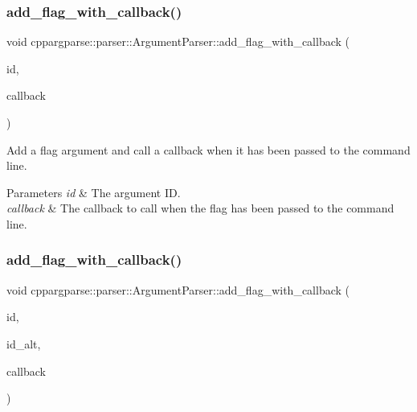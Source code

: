 \subsubsection{\texorpdfstring{add\+\_\+flag\+\_\+with\+\_\+callback()}{add\_flag\_with\_callback()}\hspace{0.1cm}{\footnotesize\ttfamily [1/3]}}
{\footnotesize\ttfamily void cppargparse\+::parser\+::\+Argument\+Parser\+::add\+\_\+flag\+\_\+with\+\_\+callback (\begin{DoxyParamCaption}\item[{const std\+::string \&}]{id,  }\item[{const std\+::function$<$ void(const \hyperlink{classcppargparse_1_1parser_1_1ArgumentParser}{Argument\+Parser} \&)$>$ \&}]{callback }\end{DoxyParamCaption})\hspace{0.3cm}{\ttfamily [inline]}}



Add a flag argument and call a callback when it has been passed to the command line. 


\begin{DoxyParams}{Parameters}
{\em id} & The argument ID. \\
\hline
{\em callback} & The callback to call when the flag has been passed to the command line. \\
\hline
\end{DoxyParams}
\mbox{\label{classcppargparse_1_1parser_1_1ArgumentParser_ac117877909d58e4a18d6a5094c2c6877}} 
\subsubsection{\texorpdfstring{add\+\_\+flag\+\_\+with\+\_\+callback()}{add\_flag\_with\_callback()}\hspace{0.1cm}{\footnotesize\ttfamily [2/3]}}
{\footnotesize\ttfamily void cppargparse\+::parser\+::\+Argument\+Parser\+::add\+\_\+flag\+\_\+with\+\_\+callback (\begin{DoxyParamCaption}\item[{const std\+::string \&}]{id,  }\item[{const std\+::string \&}]{id\+\_\+alt,  }\item[{const std\+::function$<$ void(const \hyperlink{classcppargparse_1_1parser_1_1ArgumentParser}{Argument\+Parser} \&)$>$ \&}]{callback }\end{DoxyParamCaption})\hspace{0.3cm}{\ttfamily [inline]}}



